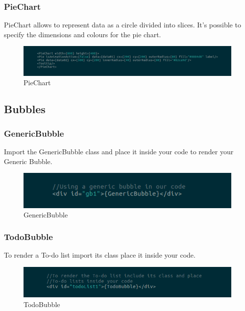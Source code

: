 \subsubsection{PieChart}
PieChart allows to represent data as a circle divided into slices. It's possible to specify the dimensions and colours for the pie chart. 
\begin{figure}[H]
	\centering
	\includegraphics[width=14cm]{../../documenti/UserManualFramework/framework_view/19framework_view_pie.png}
	\caption{PieChart}
\end{figure}

\subsection{Bubbles}
\subsubsection{GenericBubble}
Import the GenericBubble class and place it inside your code to render your Generic Bubble. 
\begin{figure}[H]
	\centering
	\includegraphics[width=14cm]{../../documenti/UserManualFramework/framework_view/20framework_view_generic.png}
	\caption{GenericBubble}
\end{figure}

\subsubsection{TodoBubble}
To render a To-do list import its class place it inside your code. 
\begin{figure}[H]
	\centering
	\includegraphics[width=14cm]{../../documenti/UserManualFramework/framework_view/22framework_view_todo.png}
	\caption{TodoBubble}
\end{figure}

